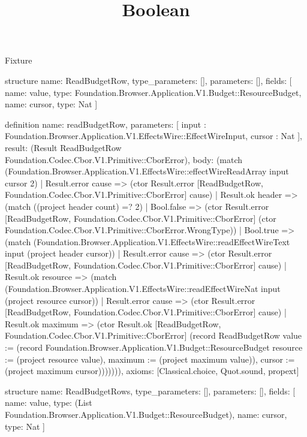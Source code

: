 \begin{lexlean}{Fixture}
\title{Boolean}
\begin{semanticmodule}
structure{
  name: ReadBudgetRow,
  type_parameters: [],
  parameters: [],
  fields: [
    {name: value, type: Foundation.Browser.Application.V1.Budget::ResourceBudget},
    {name: cursor, type: Nat}
  ]
}

definition{
  name: readBudgetRow,
  parameters: [
    input : Foundation.Browser.Application.V1.EffectsWire::EffectWireInput,
    cursor : Nat
  ],
  result: (Result ReadBudgetRow Foundation.Codec.Cbor.V1.Primitive::CborError),
  body: (match (Foundation.Browser.Application.V1.EffectsWire::effectWireReadArray input cursor 2)
    | Result.error cause => (ctor Result.error [ReadBudgetRow, Foundation.Codec.Cbor.V1.Primitive::CborError] cause)
    | Result.ok header => (match ((project header count) =? 2)
      | Bool.false => (ctor Result.error [ReadBudgetRow, Foundation.Codec.Cbor.V1.Primitive::CborError] (ctor Foundation.Codec.Cbor.V1.Primitive::CborError.WrongType))
      | Bool.true => (match (Foundation.Browser.Application.V1.EffectsWire::readEffectWireText input (project header cursor))
        | Result.error cause => (ctor Result.error [ReadBudgetRow, Foundation.Codec.Cbor.V1.Primitive::CborError] cause)
        | Result.ok resource => (match (Foundation.Browser.Application.V1.EffectsWire::readEffectWireNat input (project resource cursor))
          | Result.error cause => (ctor Result.error [ReadBudgetRow, Foundation.Codec.Cbor.V1.Primitive::CborError] cause)
          | Result.ok maximum => (ctor Result.ok [ReadBudgetRow, Foundation.Codec.Cbor.V1.Primitive::CborError] (record ReadBudgetRow {value := (record Foundation.Browser.Application.V1.Budget::ResourceBudget {resource := (project resource value), maximum := (project maximum value)}), cursor := (project maximum cursor)})))))),
  axioms: [Classical.choice, Quot.sound, propext]
}

structure{
  name: ReadBudgetRows,
  type_parameters: [],
  parameters: [],
  fields: [
    {name: value, type: (List Foundation.Browser.Application.V1.Budget::ResourceBudget)},
    {name: cursor, type: Nat}
  ]
}


\end{semanticmodule}
\end{lexlean}

